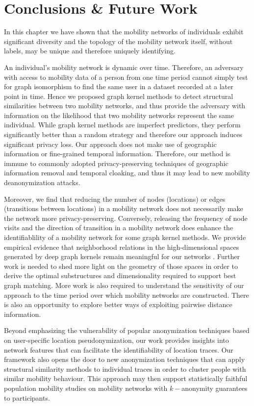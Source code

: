 

\section{Conclusions \& Future Work}

In this chapter we have shown that the mobility networks of individuals exhibit significant diversity and the topology of the mobility network itself, without labels, may be unique and therefore uniquely identifying.

An individual's mobility network is dynamic over time.
Therefore, an adversary with access to mobility data of a person from one time period cannot simply test for graph isomorphism to find the same user in a dataset recorded at a later point in time.
Hence we proposed graph kernel methods to detect structural similarities between two mobility networks, and thus provide the adversary with information on the likelihood that two mobility networks represent the same individual.
While graph kernel methods are imperfect predictors, they perform significantly better than a random strategy and therefore our approach induces significant privacy loss.
Our approach does not make use of geographic information or fine-grained temporal information. Therefore, our method is immune to commonly adopted privacy-preserving techniques of geographic information removal and temporal cloaking, and thus it may lead to new mobility deanonymization attacks.

Moreover, we find that reducing the number of nodes (locations) or edges (transitions between locations) in a mobility network does not necessarily make the network more privacy-preserving.
Conversely, releasing the frequency of node visits and the direction of transition in a mobility network does enhance the identifiablility of a mobility network for some graph kernel methods.
We provide empirical evidence that neighborhood relations in the high-dimensional spaces generated by deep graph kernels remain meaningful for our networks \cite{Beyer}.
Further work is needed to shed more light on the geometry of those spaces in order to derive the optimal substructures and dimensionality required to support best graph matching.
More work is also required to understand the sensitivity of our approach to the time period over which mobility networks are constructed.
There is also an opportunity to explore better ways of exploiting pairwise distance information.

Beyond emphasizing the vulnerability of popular anonymization techniques based on user-specific location pseudonymization, our work provides insights into network features that can facilitate the identifiability of location traces.
Our framework also opens the door to new anonymization techniques that can apply structural similarity methods to individual traces in order to cluster people with similar mobility behaviour.
This approach may then support statistically faithful population mobility studies on mobility networks with $k-$anonymity guarantees to participants.


